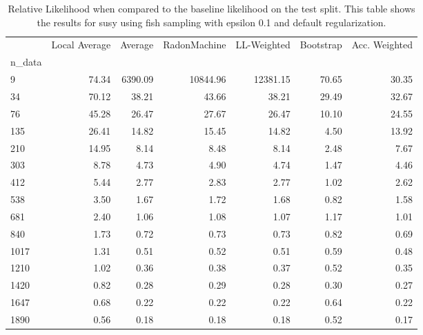 \begin{table}
\centering
\caption{Relative Likelihood when compared to the baseline likelihood on the test split. This table shows the results for  susy using  fish sampling with epsilon  0.1 and  default regularization.}
\label{tab:12}
\begin{tabular}{lrrrrrr}
\toprule
{} &  Local Average &  Average &  RadonMachine &  LL-Weighted &  Bootstrap &  Acc. Weighted \\
n\_data &                &          &               &              &            &                \\
\midrule
9      &          74.34 &  6390.09 &      10844.96 &     12381.15 &      70.65 &          30.35 \\
34     &          70.12 &    38.21 &         43.66 &        38.21 &      29.49 &          32.67 \\
76     &          45.28 &    26.47 &         27.67 &        26.47 &      10.10 &          24.55 \\
135    &          26.41 &    14.82 &         15.45 &        14.82 &       4.50 &          13.92 \\
210    &          14.95 &     8.14 &          8.48 &         8.14 &       2.48 &           7.67 \\
303    &           8.78 &     4.73 &          4.90 &         4.74 &       1.47 &           4.46 \\
412    &           5.44 &     2.77 &          2.83 &         2.77 &       1.02 &           2.62 \\
538    &           3.50 &     1.67 &          1.72 &         1.68 &       0.82 &           1.58 \\
681    &           2.40 &     1.06 &          1.08 &         1.07 &       1.17 &           1.01 \\
840    &           1.73 &     0.72 &          0.73 &         0.73 &       0.82 &           0.69 \\
1017   &           1.31 &     0.51 &          0.52 &         0.51 &       0.59 &           0.48 \\
1210   &           1.02 &     0.36 &          0.38 &         0.37 &       0.52 &           0.35 \\
1420   &           0.82 &     0.28 &          0.29 &         0.28 &       0.30 &           0.27 \\
1647   &           0.68 &     0.22 &          0.22 &         0.22 &       0.64 &           0.22 \\
1890   &           0.56 &     0.18 &          0.18 &         0.18 &       0.52 &           0.17 \\
\bottomrule
\end{tabular}
\end{table}

